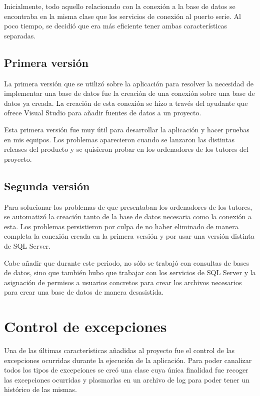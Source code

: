 Inicialmente, todo aquello relacionado con la conexión a la base de datos se encontraba en la misma clase que los servicios de conexión al puerto serie. Al poco tiempo, se decidió que era más eficiente tener ambas características separadas.

\subsection{Primera versión}

La primera versión que se utilizó sobre la aplicación para resolver la necesidad de implementar una base de datos fue la creación de una conexión sobre una base de datos ya creada. La creación de esta conexión se hizo a través del ayudante que ofrece Visual Studio para añadir fuentes de datos a un proyecto. 

Esta primera versión fue muy útil para desarrollar la aplicación y hacer pruebas en mis equipos. Los problemas aparecieron cuando se lanzaron las distintas releases del producto y se quisieron probar en los ordenadores de los tutores del proyecto.

\subsection{Segunda versión}

Para solucionar los problemas de que presentaban los ordenadores de los tutores, se automatizó la creación tanto de la base de datos necesaria como la conexión a esta. Los problemas persistieron por culpa de no haber eliminado de manera completa la conexión creada en la primera versión y por usar una versión distinta de SQL Server.

Cabe añadir que durante este periodo, no sólo se trabajó con consultas de bases de datos, sino que también hubo que trabajar con los servicios de SQL Server y la asignación de permisos a usuarios concretos para crear los archivos necesarios para crear una base de datos de manera desasistida.

\section{Control de excepciones}

Una de las últimas características añadidas al proyecto fue el control de las excepciones ocurridas durante la ejecución de la aplicación. Para poder canalizar todos los tipos de excepciones se creó una clase cuya única finalidad fue recoger las excepciones ocurridas y plasmarlas en un archivo de log para poder tener un histórico de las mismas.

